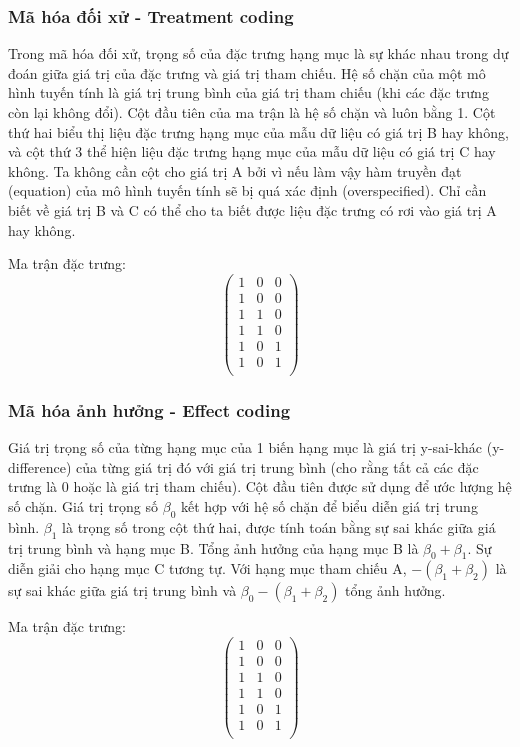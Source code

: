 \subsubsection{Mã hóa đối xử - Treatment coding}
Trong mã hóa đối xử, trọng số của đặc trưng hạng mục là sự khác nhau trong dự đoán giữa giá trị của đặc trưng và giá trị tham chiếu. Hệ số chặn của một mô hình tuyến tính là giá trị trung bình của giá trị tham chiếu (khi các đặc trưng còn lại không đổi). Cột đầu tiên của ma trận là hệ số chặn và luôn bằng 1. Cột thứ hai biểu thị liệu đặc trưng hạng mục của mẫu dữ liệu có giá trị B hay không, và cột thứ 3 thể hiện liệu đặc trưng hạng mục của mẫu dữ liệu có giá trị C hay không. Ta không cần cột cho giá trị A bởi vì nếu làm vậy hàm truyền đạt (equation) của mô hình tuyến tính sẽ bị quá xác định (overspecified). Chỉ cần biết về giá trị B và C có thể cho ta biết được liệu đặc trưng có rơi vào giá trị A hay không.

Ma trận đặc trưng:
$$\begin{pmatrix}1&0&0\\1&0&0\\1&1&0\\1&1&0\\1&0&1\\1&0&1\\\end{pmatrix}$$

\subsubsection{Mã hóa ảnh hưởng - Effect coding}
Giá trị trọng số của từng hạng mục của 1 biến hạng mục là giá trị y-sai-khác (y-difference) của từng giá trị đó với giá trị trung bình (cho rằng tất cả các đặc trưng là 0 hoặc là giá trị tham chiếu). Cột đầu tiên được sử dụng để ước lượng hệ số chặn. Giá trị trọng số $\beta_{0}$ kết hợp với hệ số chặn để biểu diễn giá trị trung bình. $\beta_{1}$ là trọng số trong cột thứ hai, được tính toán bằng sự sai khác giữa giá trị trung bình và hạng mục B. Tổng ảnh hưởng của hạng mục B là $\beta_{0}+\beta_{1}$. Sự diễn giải cho hạng mục C tương tự. Với hạng mục tham chiếu A, $-(\beta_{1}+\beta_{2})$ là sự sai khác giữa giá trị trung bình và $\beta_{0}-(\beta_{1}+\beta_{2})$ tổng ảnh hưởng.

Ma trận đặc trưng:
$$\begin{pmatrix}1&0&0\\1&0&0\\1&1&0\\1&1&0\\1&0&1\\1&0&1\\\end{pmatrix}$$

